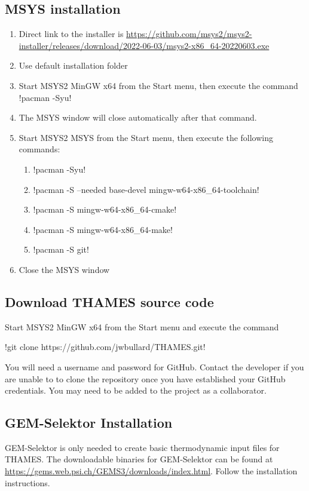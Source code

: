 \documentclass{article}
\begin{document}
\subsection{MSYS installation}
\begin{enumerate}
  \item Direct link to the installer is \url{https://github.com/msys2/msys2-installer/releases/download/2022-06-03/msys2-x86_64-20220603.exe}
  \item Use default installation folder
  \item Start MSYS2 MinGW x64 from the Start menu, then execute the command
    !pacman -Syu!
  \item The MSYS window will close automatically after that command.
  \item Start MSYS2 MSYS from the Start menu, then execute the following commands:
  \begin{enumerate}
    \item !pacman -Syu!
    \item !pacman -S --needed base-devel mingw-w64-x86_64-toolchain!
    \item !pacman -S mingw-w64-x86_64-cmake!
    \item !pacman -S mingw-w64-x86_64-make!
    \item !pacman -S git!
  \end{enumerate}
  \item Close the MSYS window
\end{enumerate}
 
\subsection{Download THAMES source code}
Start MSYS2 MinGW x64 from the Start menu and execute the command

!git clone https://github.com/jwbullard/THAMES.git!

You will need a username and password for GitHub.  Contact the developer
if you are unable to to clone the repository once you have established
your GitHub credentials.  You may need to be added to the project as a 
collaborator.
 
\subsection{GEM-Selektor Installation}
GEM-Selektor is only needed to create basic thermodynamic input files for
THAMES.
The downloadable binaries for GEM-Selektor can be found
at \url{https://gems.web.psi.ch/GEMS3/downloads/index.html}. Follow the
installation instructions.
\end{document}

